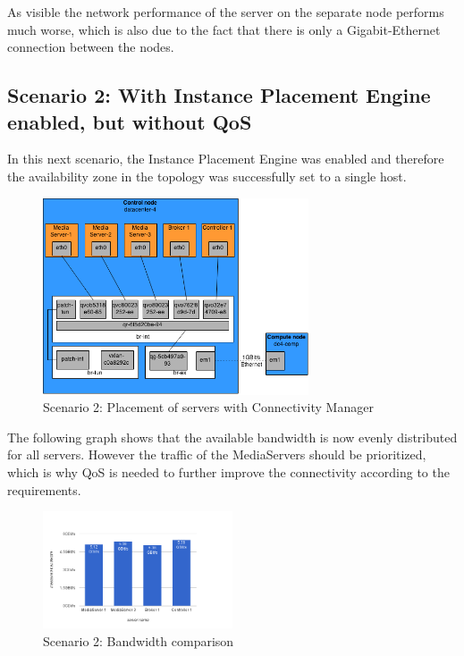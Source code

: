 As visible the network performance of the server on the separate node performs much worse, which is also due to the fact that there is only a Gigabit-Ethernet connection between the nodes.

\subsection{Scenario 2: With Instance Placement Engine enabled, but without QoS}

In this next scenario, the Instance Placement Engine was enabled and therefore the availability zone in the topology was successfully set to a single host.

\begin{figure}[H]
\centering

\includegraphics[width=0.7\textwidth]{images/evaluation/testbed_scenario2}

\caption{Scenario 2: Placement of servers with Connectivity Manager}
\end{figure}

The following graph shows that the available bandwidth is now evenly distributed for all servers. However the traffic of the MediaServers should be prioritized, which is why QoS is needed to further improve the connectivity according to the requirements.

\begin{figure}[H]
\centering

\includegraphics[width=0.5\textwidth]{images/evaluation/testbed_scenario2_bw}

\caption{Scenario 2: Bandwidth comparison}
\end{figure}



